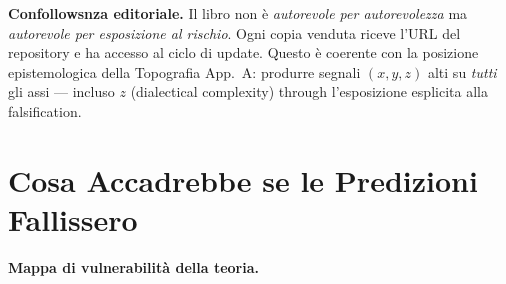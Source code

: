 \Proved{} \textbf{Confollowsnza editoriale.} Il libro non è
\emph{autorevole per autorevolezza} ma \emph{autorevole per esposizione
al rischio}. Ogni copia venduta riceve l'URL del repository e ha accesso
al ciclo di update. Questo è coerente con la posizione epistemologica
della Topografia App.~A: produrre segnali \((x, y, z)\) alti su
\emph{tutti} gli assi --- incluso \(z\) (dialectical complexity) through
l'esposizione esplicita alla falsification.



\section{Cosa Accadrebbe se le Predizioni
Fallissero}\label{cosa-accadrebbe-se-le-predizioni-fallissero}

\Hypoth{} \textbf{Mappa di vulnerabilità della teoria.}

